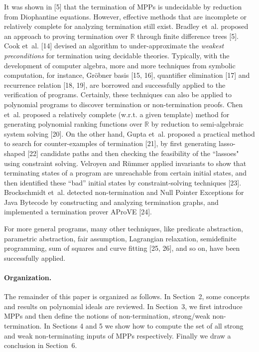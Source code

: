 \documentclass{article}
\begin{document}
It was shown in [5] that the termination of MPPs is undecidable by reduction from Diophantine equations. However, effective methods that are incomplete or relatively complete for analyzing termination still exist. Bradley et~al. proposed an approach to proving termination over $\mathbb{R}$ through finite difference trees [5]. Cook et~al. [14] devised an algorithm to under-approximate the \emph{weakest preconditions} for termination using decidable theories. Typically, with the development of computer algebra, more and more techniques from symbolic computation, for instance, Gr\"{o}bner basis [15, 16], quantifier elimination [17] and recurrence relation [18, 19], are borrowed and successfully applied to the verification of  programs. Certainly, these techniques can also be applied to polynomial programs to discover termination or non-termination proofs. Chen et~al. proposed a relatively complete (w.r.t. a given template) method for generating polynomial ranking functions over $\mathbb{R}$ by reduction to semi-algebraic system solving [20]. On the other hand, Gupta et~al. proposed a practical method to search for counter-examples of termination [21], by first generating lasso-shaped [22] candidate paths and then checking the feasibility of the ``lassoes" using constraint solving. Velroyen and R\"{u}mmer applied invariants to show that terminating states of a program are unreachable from certain initial states, and then identified these ``bad'' initial states by constraint-solving techniques [23]. Brockschmidt et~al. detected non-termination and Null Pointer Exceptions for \textsf{Java Bytecode} by constructing and analyzing termination graphs, and implemented a termination prover \textsf{AProVE} [24].

For more general programs, many other techniques, like predicate abstraction, parametric abstraction, fair assumption, Lagrangian relaxation, semidefinite programming, sum of squares and curve fitting [25, 26], and so on, have been successfully applied.


\paragraph{Organization.}
The remainder of this paper is organized as follows. In Section~2, some concepts and results on polynomial ideals are reviewed. In Section~3, we first introduce MPPs and then define the notions of non-termination, strong/weak non-termination. In Sections 4 and 5 we show how to compute the set of all strong and weak non-terminating inputs of MPPs respectively. Finally we draw a conclusion in Section~6.
\end{document}
